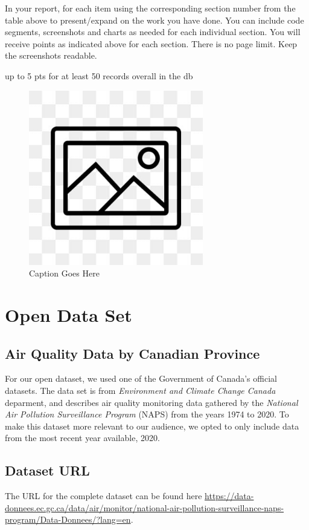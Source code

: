 \documentclass[12pt, letterpaper]{article}
\begin{document}
In your report, for each item using the corresponding section number from the table above to present/expand on the work you have done. You can include code segments, screenshots and charts as needed for each individual section. You will receive points as indicated above for each section. There is no page limit. Keep the screenshots readable.

up to 5 pts for at least 50 records overall in the db

\begin{figure}[htbp]
	\centering
	\includegraphics[width=3in]{images/placeholder.jpg}
	\caption{Caption Goes Here}
 \end{figure}

 \newpage

\section{Open Data Set}

\subsection*{Air Quality Data by Canadian Province}
For our open dataset, we used one of the Government of Canada's official datasets. The data set is from \textit{Environment and Climate Change Canada} deparment, and describes air quality monitoring data gathered by the \textit{National Air Pollution Surveillance Program} (NAPS) from the years 1974 to 2020. To make this dataset more relevant to our audience, we opted to only include data from the most recent year available, 2020.

\subsection*{Dataset URL}
The URL for the complete dataset can be found here \url{https://data-donnees.ec.gc.ca/data/air/monitor/national-air-pollution-surveillance-naps-program/Data-Donnees/?lang=en}.
\end{document}
